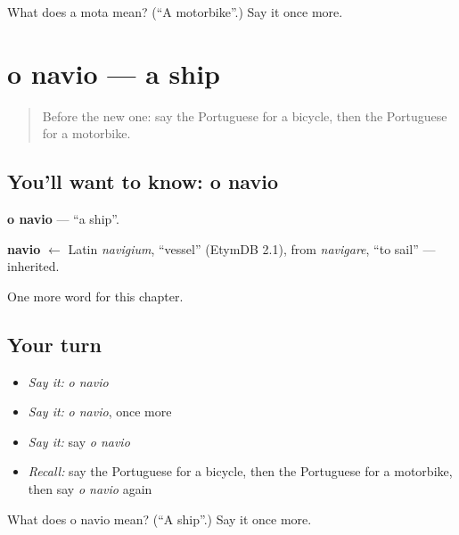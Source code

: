 \begin{tcolorbox}[breakable,colback=teal!4,colframe=teal!35!black,title={Before you move on}]
What does a mota mean? (\textquotedblleft{}A motorbike\textquotedblright{}.) Say it once more.
\end{tcolorbox}
\section[o navio]{o navio — a ship}

\label{lesson:PT-C92-navio}



\begin{quote}
Before the new one: say the Portuguese for a bicycle, then the Portuguese for a motorbike.
\end{quote}

\subsection*{You'll want to know: o navio}
\textbf{o navio} — \textquotedblleft{}a ship\textquotedblright{}.

\begin{cousinweb}
\textbf{navio} $\leftarrow$ Latin \emph{navigium}, \textquotedblleft{}vessel\textquotedblright{} (EtymDB 2.1), from \emph{navigare}, \textquotedblleft{}to sail\textquotedblright{} — inherited.
\end{cousinweb}

\begin{grammarlens}[title={What you've built}]
One more word for this chapter.
\end{grammarlens}

\subsection*{Your turn}
\begin{itemize}
\raggedright
  \item \emph{Say it:} \emph{o navio}
  \item \emph{Say it:} \emph{o navio}, once more
  \item \emph{Say it:} say \emph{o navio}
  \item \emph{Recall:} say the Portuguese for a bicycle, then the Portuguese for a motorbike, then say \emph{o navio} again
\end{itemize}

\begin{tcolorbox}[breakable,colback=teal!4,colframe=teal!35!black,title={Before you move on}]
What does o navio mean? (\textquotedblleft{}A ship\textquotedblright{}.) Say it once more.
\end{tcolorbox}
